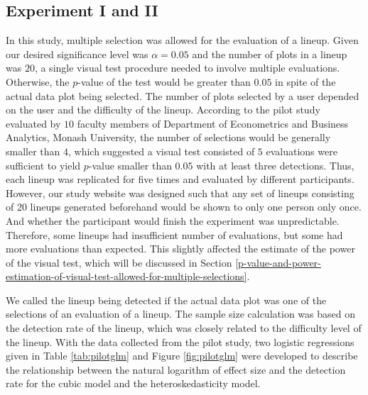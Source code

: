 \documentclass{monashthesis}
\theoremstyle{definition}
\theoremstyle{definition}
\theoremstyle{definition}
\theoremstyle{definition}
\theoremstyle{remark}
\begin{document}
\hypertarget{experiment-i-and-ii}{%
\subsection{Experiment I and II}\label{experiment-i-and-ii}}

In this study, multiple selection was allowed for the evaluation of a lineup. Given our desired significance level was \(\alpha = 0.05\) and the number of plots in a lineup was \(20\), a single visual test procedure needed to involve multiple evaluations. Otherwise, the \(p\)-value of the test would be greater than \(0.05\) in spite of the actual data plot being selected. The number of plots selected by a user depended on the user and the difficulty of the lineup. According to the pilot study evaluated by \(10\) faculty members of Department of Econometrics and Business Analytics, Monash University, the number of selections would be generally smaller than \(4\), which suggested a visual test consisted of \(5\) evaluations were sufficient to yield \(p\)-value smaller than \(0.05\) with at least three detections. Thus, each lineup was replicated for five times and evaluated by different participants. However, our study website was designed such that any set of lineups consisting of 20 lineups generated beforehand would be shown to only one person only once. And whether the participant would finish the experiment was unpredictable. Therefore, some lineups had insufficient number of evaluations, but some had more evaluations than expected. This slightly affected the estimate of the power of the visual test, which will be discussed in Section \ref{p-value-and-power-estimation-of-visual-test-allowed-for-multiple-selections}.

We called the lineup being detected if the actual data plot was one of the selections of an evaluation of a lineup. The sample size calculation was based on the detection rate of the lineup, which was closely related to the difficulty level of the lineup. With the data collected from the pilot study, two logistic regressions given in Table \ref{tab:pilotglm} and Figure \ref{fig:pilotglm} were developed to describe the relationship between the natural logarithm of effect size and the detection rate for the cubic model and the heteroskedasticity model.
\end{document}
